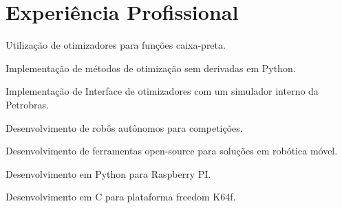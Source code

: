 \documentclass[A4]{deedy-resume} %
\begin{document}
\begin{minipage}[t]{0.66\textwidth} %



\section{Experiência Profissional}

\vspace{\topsep} %
\vspace{\topsep} %
\begin{tightitemize}
 \item Utilização de otimizadores para funções caixa-preta.
 \item Implementação de métodos de otimização sem derivadas em Python.
 \item Implementação de Interface de otimizadores com um simulador interno da Petrobras.

\end{tightitemize}
\sectionspace %


\vspace{\topsep} %
\begin{tightitemize}
 \item Desenvolvimento de robôs autônomos para competições.
 \item Desenvolvimento de ferramentas open-source para soluções em robótica móvel.
\end{tightitemize}

\sectionspace %

\vspace{\topsep} %
\begin{tightitemize}
 \item Desenvolvimento em Python para Raspberry PI.
 \item Desenvolvimento em C para plataforma freedom K64f.
\end{tightitemize}




\end{minipage}
\end{document}
